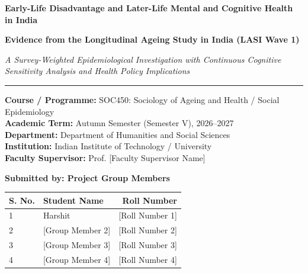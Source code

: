 
\begin{titlepage}
    \centering
    \vspace*{1.0cm}
    
    {\Huge \bfseries \color{navyblue} Early-Life Disadvantage and Later-Life Mental and Cognitive Health in India\par}
    
    \vspace{0.6cm}
    {\LARGE \bfseries \color{darkslate} Evidence from the Longitudinal Ageing Study in India (LASI Wave 1)\par}
    
    \vspace{0.4cm}
    {\large \itshape A Survey-Weighted Epidemiological Investigation with Continuous Cognitive Sensitivity Analysis and Health Policy Implications\par}
    
    \vspace{1.5cm}
    \rule{0.85\textwidth}{1.5pt}
    \vspace{1.5cm}
    
    \begin{minipage}[t]{0.85\textwidth}
        \large
        \textbf{Course / Programme:} SOC450: Sociology of Ageing and Health / Social Epidemiology \\
        \textbf{Academic Term:} Autumn Semester (Semester V), 2026--2027 \\
        \textbf{Department:} Department of Humanities and Social Sciences \\
        \textbf{Institution:} Indian Institute of Technology / University \\
        \textbf{Faculty Supervisor:} Prof. [Faculty Supervisor Name]
    \end{minipage}
    
    \vspace{1.8cm}
    
    \textbf{\large Submitted by: Project Group Members}
    
    \vspace{0.4cm}
    
    \begin{table}[H]
        \centering
        \large
        \begin{tabular}{llr}
            \toprule
            \textbf{S. No.} & \textbf{Student Name} & \textbf{Roll Number} \\
            \midrule
            1 & Harshit & [Roll Number 1] \\
            2 & [Group Member 2] & [Roll Number 2] \\
            3 & [Group Member 3] & [Roll Number 3] \\
            4 & [Group Member 4] & [Roll Number 4] \\
            \bottomrule
        \end{tabular}
    \end{table}
    

\end{titlepage}
